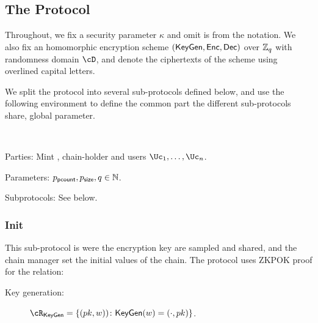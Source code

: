 \subsection{The Protocol}\label{sec:MainProtocol:Protocol}
Throughout, we fix a security parameter $\kappa$ and omit is from the notation. We also fix an homomorphic encryption scheme $(\mathsf{KeyGen},\mathsf{Enc},\mathsf{Dec})$ over ${\mathbb Z}_q$ with randomness domain $\cD$, and denote the ciphertexts of the scheme using  overlined capital letters.  %


We split  the protocol into several sub-protocols defined below, and  use the  following environment to define the common part the different sub-protocols share, \eg global parameter. 

\begin{protocol}~\label{prot:ConfidentialTransactions}


	
\item[Parties:] Mint \Mc, chain-holder \Cc and users  $\Uc_1, \ldots,\Uc_n$.

\item[Parameters:] $p_{\mathsf{pcount}},p_{\mathsf{size}},q \in {\mathbb{N}}$.

\item[Subprotocols:]  See below.
\end{protocol}


\subsubsection{Init}


This sub-protocol is were the encryption key are sampled and shared, and the chain manager \Cc set the initial values of the chain. The protocol  uses ZKPOK proof for the relation:
\begin{description}
	\item[Key generation:]    $\rKeyGen =\rKeyGenDef$.
\end{description}


